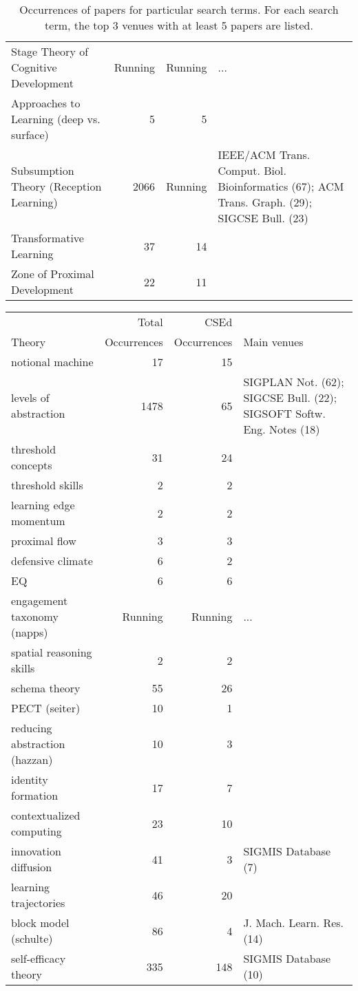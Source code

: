 \begin{table*}[t]
\begin{tabular}{lrrp{6cm}}
Stage Theory of Cognitive Development & Running & Running & ... \\
Approaches to Learning (deep vs. surface) & 5 & 5 &  \\
Subsumption Theory (Reception Learning) & 2066 & Running & IEEE/ACM Trans. Comput. Biol. Bioinformatics (67); ACM Trans. Graph. (29); SIGCSE Bull. (23) \\
Transformative Learning & 37 & 14 &  \\
Zone of Proximal Development & 22 & 11 &  \\
\end{tabular}
\caption{Occurrences of papers for particular search terms. For each search term, the top 3 venues with at least 5 papers are listed.}
\end{table*}

\begin{table*}[t]
\begin{tabular}{lrrp{6cm}}
& Total & CSEd & \\Theory & Occurrences & Occurrences & Main venues\\\hline
notional machine & 17 & 15 &  \\
levels of abstraction & 1478 & 65 & SIGPLAN Not. (62); SIGCSE Bull. (22); SIGSOFT Softw. Eng. Notes (18) \\
threshold concepts & 31 & 24 &  \\
threshold skills & 2 & 2 &  \\
learning edge momentum & 2 & 2 &  \\
proximal flow & 3 & 3 &  \\
defensive climate & 6 & 2 &  \\
EQ & 6 & 6 &  \\
engagement taxonomy (napps) & Running & Running & ... \\
spatial reasoning skills & 2 & 2 &  \\
schema theory & 55 & 26 &  \\
PECT (seiter) & 10 & 1 &  \\
reducing abstraction (hazzan) & 10 & 3 &  \\
identity formation & 17 & 7 &  \\
contextualized computing & 23 & 10 &  \\
innovation diffusion & 41 & 3 & SIGMIS Database (7) \\
learning trajectories & 46 & 20 &  \\
block model (schulte) & 86 & 4 & J. Mach. Learn. Res. (14) \\
self-efficacy theory & 335 & 148 & SIGMIS Database (10) \\

\end{tabular}
\end{table*}
